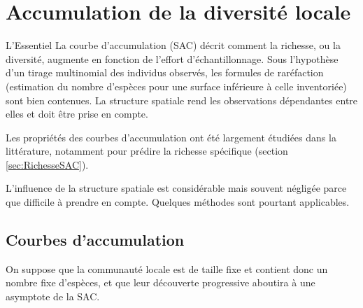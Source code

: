 \documentclass[
  11pt,
  french,
  a4paper,
  extrafontsizes,onecolumn,openright
  ]{memoir}
\newenvironment{Summary}
  {\begin{bclogo}[logo=\bctrombone, noborder=true, couleur=lightgray!50]{L'Essentiel}\parindent0pt}
  {\end{bclogo}}
\newlength{\rf}
\begin{document}
\normalsize

\hypertarget{chap:Accumulation}{%
\chapter{Accumulation de la diversité locale}\label{chap:Accumulation}}

\scriptsize

\begin{Summary}
La courbe d'accumulation (SAC) décrit comment la richesse, ou la
diversité, augmente en fonction de l'effort d'échantillonnage. Sous
l'hypothèse d'un tirage multinomial des individus observés, les formules
de raréfaction (estimation du nombre d'espèces pour une surface
inférieure à celle inventoriée) sont bien contenues. La structure
spatiale rend les observations dépendantes entre elles et doit être
prise en compte.
\end{Summary}

\normalsize

Les propriétés des courbes d'accumulation ont été largement étudiées dans la littérature, notamment pour prédire la richesse spécifique (section \ref{sec:RichesseSAC}).

L'influence de la structure spatiale est considérable mais souvent négligée parce que difficile à prendre en compte.
Quelques méthodes sont pourtant applicables.

\hypertarget{courbes-daccumulation}{%
\section{Courbes d'accumulation}\label{courbes-daccumulation}}

On suppose que la communauté locale est de taille fixe et contient donc un nombre fixe d'espèces, et que leur découverte progressive aboutira à une asymptote de la SAC.



\scriptsize
\end{document}
